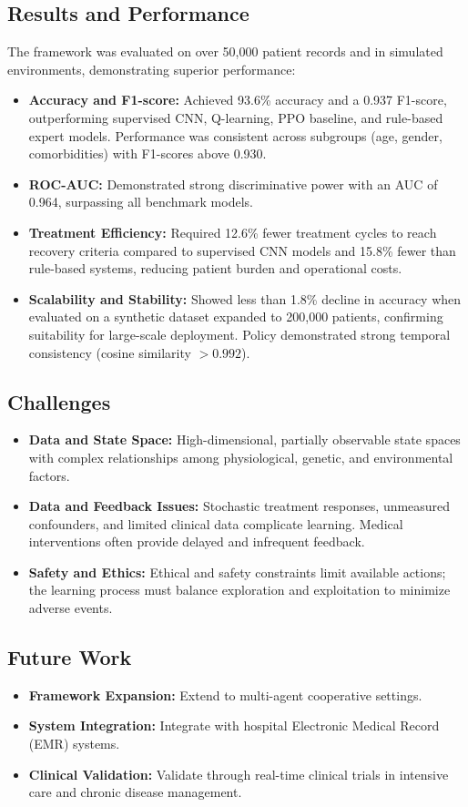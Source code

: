 \subsection*{Results and Performance}
The framework was evaluated on over 50,000 patient records and in simulated environments, demonstrating superior performance:
\begin{itemize}
    \item \textbf{Accuracy and F1-score:} Achieved 93.6\% accuracy and a 0.937 F1-score, outperforming supervised CNN, Q-learning, PPO baseline, and rule-based expert models. Performance was consistent across subgroups (age, gender, comorbidities) with F1-scores above 0.930.
    \item \textbf{ROC-AUC:} Demonstrated strong discriminative power with an AUC of 0.964, surpassing all benchmark models.
    \item \textbf{Treatment Efficiency:} Required 12.6\% fewer treatment cycles to reach recovery criteria compared to supervised CNN models and 15.8\% fewer than rule-based systems, reducing patient burden and operational costs.
    \item \textbf{Scalability and Stability:} Showed less than 1.8\% decline in accuracy when evaluated on a synthetic dataset expanded to 200,000 patients, confirming suitability for large-scale deployment. Policy demonstrated strong temporal consistency (cosine similarity $>0.992$).
\end{itemize}

\subsection*{Challenges}
\begin{itemize}
    \item \textbf{Data and State Space:} High-dimensional, partially observable state spaces with complex relationships among physiological, genetic, and environmental factors.
    \item \textbf{Data and Feedback Issues:} Stochastic treatment responses, unmeasured confounders, and limited clinical data complicate learning. Medical interventions often provide delayed and infrequent feedback.
    \item \textbf{Safety and Ethics:} Ethical and safety constraints limit available actions; the learning process must balance exploration and exploitation to minimize adverse events.
\end{itemize}

\subsection*{Future Work}
\begin{itemize}
    \item \textbf{Framework Expansion:} Extend to multi-agent cooperative settings.
    \item \textbf{System Integration:} Integrate with hospital Electronic Medical Record (EMR) systems.
    \item \textbf{Clinical Validation:} Validate through real-time clinical trials in intensive care and chronic disease management.
\end{itemize}

